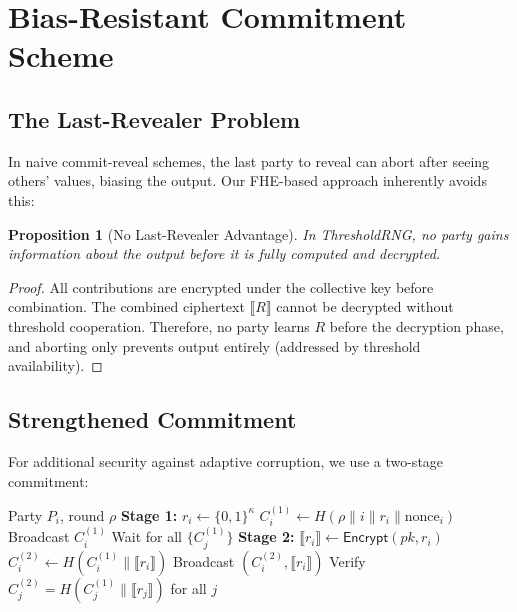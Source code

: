 \documentclass[11pt,a4paper]{article}
\newtheorem{proposition}[theorem]{Proposition}
\begin{document}
\section{Bias-Resistant Commitment Scheme}

\subsection{The Last-Revealer Problem}

In naive commit-reveal schemes, the last party to reveal can abort after seeing others' values, biasing the output. Our FHE-based approach inherently avoids this:

\begin{proposition}[No Last-Revealer Advantage]
In ThresholdRNG, no party gains information about the output before it is fully computed and decrypted.
\end{proposition}

\begin{proof}
All contributions are encrypted under the collective key before combination. The combined ciphertext $\llbracket R \rrbracket$ cannot be decrypted without threshold cooperation. Therefore, no party learns $R$ before the decryption phase, and aborting only prevents output entirely (addressed by threshold availability).
\end{proof}

\subsection{Strengthened Commitment}

For additional security against adaptive corruption, we use a two-stage commitment:

\begin{algorithm}
\caption{Two-Stage Commitment}
\begin{algorithmic}[1]
\Require Party $P_i$, round $\rho$
\State \textbf{Stage 1:}
\State $r_i \leftarrow \{0, 1\}^{\kappa}$
\State $C_i^{(1)} \gets H(\rho \| i \| r_i \| \text{nonce}_i)$
\State Broadcast $C_i^{(1)}$
\State Wait for all $\{C_j^{(1)}\}$
\State \textbf{Stage 2:}
\State $\llbracket r_i \rrbracket \gets \textsf{Encrypt}(pk, r_i)$
\State $C_i^{(2)} \gets H(C_i^{(1)} \| \llbracket r_i \rrbracket)$
\State Broadcast $(C_i^{(2)}, \llbracket r_i \rrbracket)$
\State Verify $C_j^{(2)} = H(C_j^{(1)} \| \llbracket r_j \rrbracket)$ for all $j$
\end{algorithmic}
\end{algorithm}
\end{document}
